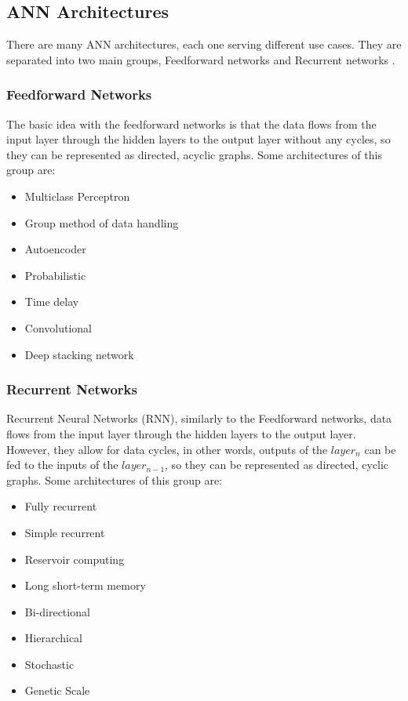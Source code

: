 \subsection{ANN Architectures}
There are many ANN architectures, each one serving different use cases. They are separated into two main groups, Feedforward networks and Recurrent networks \cite{Types-of-Artificial-Neural-Networks}.

\subsubsection{Feedforward Networks}
The basic idea with the feedforward networks is that the data flows from the input layer through the hidden layers to the output layer without any cycles, so they can be represented as directed, acyclic graphs. Some architectures of this group are:
\begin{itemize}
	\item Multiclass Perceptron
	\item Group method of data handling
	\item Autoencoder
	\item Probabilistic
	\item Time delay
	\item Convolutional
	\item Deep stacking network
\end{itemize}

\subsubsection{Recurrent Networks}
Recurrent Neural Networks (RNN), similarly to the Feedforward networks, data flows from the input layer through the hidden layers to the output layer. However, they allow for data cycles, in other words, outputs of the $layer_n$ can be fed to the inputs of the $layer_{n-1}$, so they can be represented as directed, cyclic graphs. Some architectures of this group are:
\begin{itemize}
	\item Fully recurrent
	\item Simple recurrent
	\item Reservoir computing
	\item Long short-term memory
	\item Bi-directional
	\item Hierarchical
	\item Stochastic
	\item Genetic Scale
\end{itemize}

